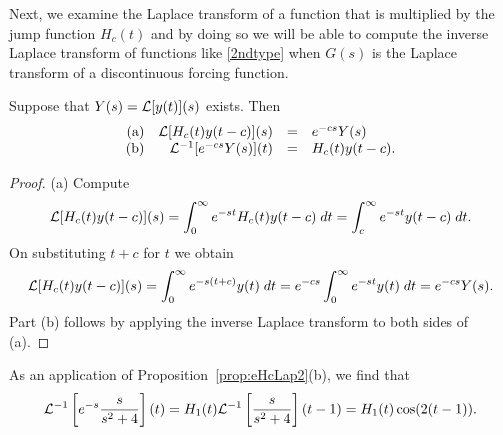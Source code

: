 \documentclass{ximera}
\begin{document}
Next, we examine the Laplace transform of a function that is multiplied 
by the jump function $H_c(t)$ and by doing so we will be able to compute the
inverse Laplace transform of functions like \eqref{2ndtype} when $G(s)$ is the 
Laplace transform of a discontinuous forcing function.

\begin{proposition}  \label{prop:eHcLap2}
Suppose that $Y(s)={\cal L}[y(t)](s)$ exists.  Then
\[
\begin{array}{rrcl}
\mbox{(a)} & {\cal L}[H_c(t)y(t-c)](s) & = & e^{-cs} Y(s) \\
\mbox{(b)} & {\cal L}^{-1}[e^{-cs}Y(s)](t) & = & H_c(t)y(t-c).
\end{array}
\]
\end{proposition}

\begin{proof} (a)  Compute
\[
{\cal L}[H_c(t)y(t-c)](s) = \int_0^{\infty} e^{-st}H_c(t) y(t-c)\; dt
= \int_c^{\infty} e^{-st}y(t-c)\; dt.
\]
On substituting $t+c$ for $t$ we obtain
\[
{\cal L}[H_c(t)y(t-c)](s)=\int_0^{\infty} e^{-s(t+c)}y(t)\; dt
=e^{-cs} \int_0^{\infty} e^{-st}y(t)\; dt
=e^{-cs} Y(s).
\]
Part (b) follows by applying the inverse Laplace transform to both sides 
of (a).  \end{proof}

As an application of Proposition~\ref{prop:eHcLap2}(b), we find that
\[
{\cal L}^{-1}\left[ e^{-s}\frac{s}{s^2+4}\right](t)=
H_1(t){\cal L}^{-1}\left[ \frac{s}{s^2+4}\right](t-1)=
H_1(t)\cos(2(t-1)).
\]



\end{document}
